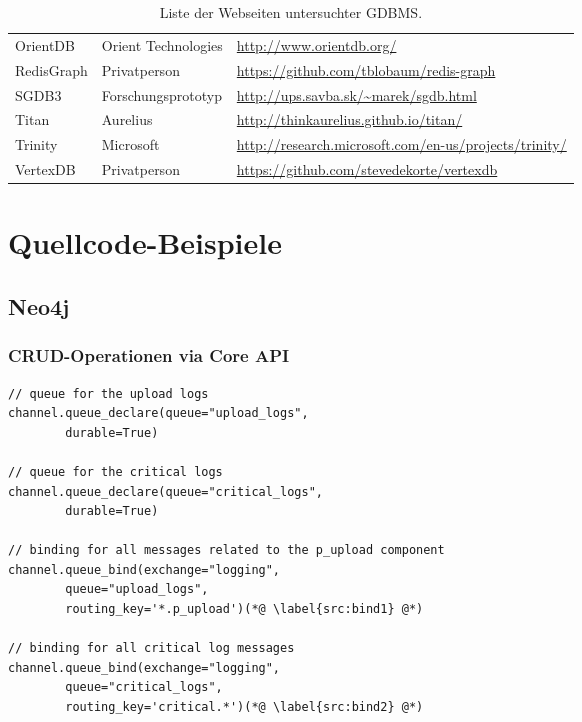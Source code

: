 \begin{table}[h]
\begin{footnotesize}
\begin{tabular}{|m{2.5cm}|m{3.5cm}|>{\arraybackslash}m{9.5cm}|}
   	OrientDB 		& Orient Technologies 	& \url{http://www.orientdb.org/} \\
   	RedisGraph 		& Privatperson 			& \url{https://github.com/tblobaum/redis-graph} \\
   	SGDB3 			& Forschungsprototyp 	& \url{http://ups.savba.sk/~marek/sgdb.html} \\
   	Titan 			& Aurelius 				& \url{http://thinkaurelius.github.io/titan/} \\
   	Trinity 		& Microsoft 			& \url{http://research.microsoft.com/en-us/projects/trinity/} \\
   	VertexDB 		& Privatperson 			& \url{https://github.com/stevedekorte/vertexdb} \\
   	\hline
   	\end{tabular} 
	\end{footnotesize}
	\setlength{\belowcaptionskip}{0.25cm}	
	\caption[GDBMS-Hersteller]{Liste der Webseiten untersuchter GDBMS.}
	\label{tab:anh_urls}
\end{table}
\renewcommand{\arraystretch}{1}

\section{Quellcode-Beispiele}

\subsection{Neo4j}

\subsubsection{CRUD-Operationen via Core API}
\label{anh:neo4j_native_api}

\begin{lstlisting}
// queue for the upload logs
channel.queue_declare(queue="upload_logs",
        durable=True)

// queue for the critical logs
channel.queue_declare(queue="critical_logs",
        durable=True)
 
// binding for all messages related to the p_upload component
channel.queue_bind(exchange="logging",
        queue="upload_logs",
        routing_key='*.p_upload')(*@ \label{src:bind1} @*)

// binding for all critical log messages
channel.queue_bind(exchange="logging",
        queue="critical_logs",
        routing_key='critical.*')(*@ \label{src:bind2} @*)
\end{lstlisting}

